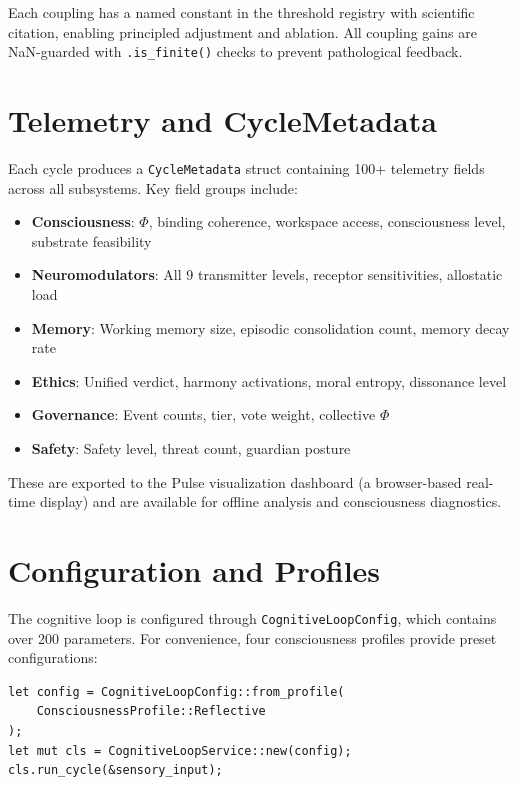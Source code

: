 \documentclass[12pt]{book}
\begin{document}
Each coupling has a named constant in the threshold registry with scientific citation, enabling principled adjustment and ablation. All coupling gains are NaN-guarded with \texttt{.is\_finite()} checks to prevent pathological feedback.

\section{Telemetry and CycleMetadata}

Each cycle produces a \texttt{CycleMetadata} struct containing 100+ telemetry fields across all subsystems. Key field groups include:

\begin{itemize}
  \item \textbf{Consciousness}: $\Phi$, binding coherence, workspace access, consciousness level, substrate feasibility
  \item \textbf{Neuromodulators}: All 9 transmitter levels, receptor sensitivities, allostatic load
  \item \textbf{Memory}: Working memory size, episodic consolidation count, memory decay rate
  \item \textbf{Ethics}: Unified verdict, harmony activations, moral entropy, dissonance level
  \item \textbf{Governance}: Event counts, tier, vote weight, collective $\Phi$
  \item \textbf{Safety}: Safety level, threat count, guardian posture
\end{itemize}

These are exported to the Pulse visualization dashboard (a browser-based real-time display) and are available for offline analysis and consciousness diagnostics.

\section{Configuration and Profiles}

The cognitive loop is configured through \texttt{CognitiveLoopConfig}, which contains over 200 parameters. For convenience, four consciousness profiles provide preset configurations:

\begin{lstlisting}[caption={Creating a CognitiveLoopService with a consciousness profile.},label=lst:cls-creation]
let config = CognitiveLoopConfig::from_profile(
    ConsciousnessProfile::Reflective
);
let mut cls = CognitiveLoopService::new(config);
cls.run_cycle(&sensory_input);
\end{lstlisting}
\end{document}

